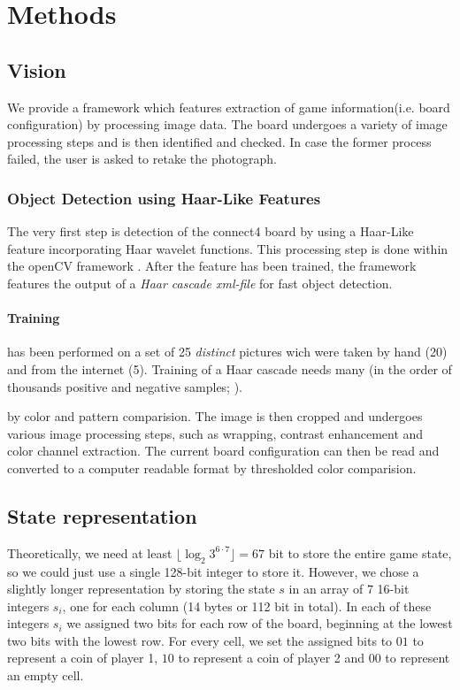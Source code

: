 \documentclass[10pt,twocolumn,letterpaper]{article}
\begin{document}
\section{Methods}

\subsection{Vision}
We provide a framework which features extraction of game information(i.e. board configuration) by processing image data.
The board undergoes a variety of image processing steps and is then identified and checked.
In case the former process failed, the user is asked to retake the photograph.

\subsubsection{Object Detection using Haar-Like Features}
The very first step is detection of the connect4 board by using a Haar-Like feature incorporating Haar wavelet functions.
This processing step is done within the openCV framework \parencite{openCV}.
After the feature has been trained, the framework features the output of a \textit{Haar cascade xml-file} for fast object detection.

\paragraph{Training} has been performed on a set of 25 \textit{distinct} pictures wich were taken by hand (20) and from the internet (5).
Training of a Haar cascade needs many (in the order of thousands positive and negative samples;  \cite{kuranov}).




 by color and pattern comparision.
The image is then cropped and undergoes various image processing steps, such as wrapping, contrast enhancement and color channel extraction.
The current board configuration can then be read and converted to a computer readable format by thresholded color comparision.

\subsection{State representation}
Theoretically, we need at least $\lfloor \log_2 3^{6\cdot 7} \rfloor = 67$ bit to store the entire game state, so we could just use a single
128-bit integer to store it.
However, we chose a slightly longer representation by storing the state $s$ in an array of $7$ 16-bit integers $s_i$, one for each column (14 bytes or 112 bit in total).
In each of these integers $s_i$ we assigned two bits for each row of the board, beginning at the lowest two bits with the lowest row.
For every cell, we set the assigned bits to $01$ to represent a coin of player 1, $10$ to represent a coin of player 2 and $00$ to represent an empty cell.
\end{document}
